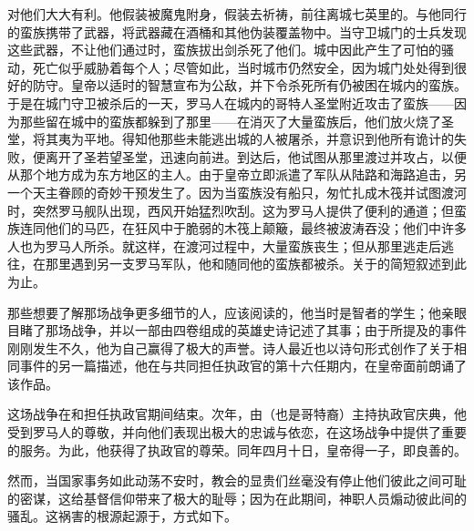 对他们大大有利。他假装被魔鬼附身，假装去祈祷，前往离城七英里的。与他同行的蛮族携带了武器，将武器藏在酒桶和其他伪装覆盖物中。当守卫城门的士兵发现这些武器，不让他们通过时，蛮族拔出剑杀死了他们。城中因此产生了可怕的骚动，死亡似乎威胁着每个人；尽管如此，当时城市仍然安全，因为城门处处得到很好的防守。皇帝以适时的智慧宣布为公敌，并下令杀死所有仍被困在城内的蛮族。于是在城门守卫被杀后的一天，罗马人在城内的哥特人圣堂附近攻击了蛮族——因为那些留在城中的蛮族都躲到了那里——在消灭了大量蛮族后，他们放火烧了圣堂，将其夷为平地。得知他那些未能逃出城的人被屠杀，并意识到他所有诡计的失败，便离开了圣若望圣堂，迅速向前进。到达后，他试图从那里渡过并攻占，以便从那个地方成为东方地区的主人。由于皇帝立即派遣了军队从陆路和海路追击，另一个天主眷顾的奇妙干预发生了。因为当蛮族没有船只，匆忙扎成木筏并试图渡河时，突然罗马舰队出现，西风开始猛烈吹刮。这为罗马人提供了便利的通道；但蛮族连同他们的马匹，在狂风中于脆弱的木筏上颠簸，最终被波涛吞没；他们中许多人也为罗马人所杀。就这样，在渡河过程中，大量蛮族丧生；但从那里逃走后逃往，在那里遇到另一支罗马军队，他和随同他的蛮族都被杀。关于的简短叙述到此为止。\par

那些想要了解那场战争更多细节的人，应该阅读的，他当时是智者的学生；他亲眼目睹了那场战争，并以一部由四卷组成的英雄史诗记述了其事；由于所提及的事件刚刚发生不久，他为自己赢得了极大的声誉。诗人最近也以诗句形式创作了关于相同事件的另一篇描述，他在与共同担任执政官的第十六任期内，在皇帝面前朗诵了该作品。\par

这场战争在和担任执政官期间结束。次年，由（也是哥特裔）主持执政官庆典，他受到罗马人的尊敬，并向他们表现出极大的忠诚与依恋，在这场战争中提供了重要的服务。为此，他获得了执政官的尊荣。同年四月十日，皇帝得一子，即良善的。\par

然而，当国家事务如此动荡不安时，教会的显贵们丝毫没有停止他们彼此之间可耻的密谋，这给基督信仰带来了极大的耻辱；因为在此期间，神职人员煽动彼此间的骚乱。这祸害的根源起源于，方式如下。\par


